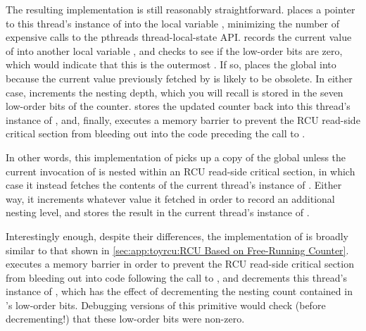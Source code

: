 \begin{lineref}
The resulting  implementation is still reasonably
straightforward.
 places a pointer to
this thread's instance of 
into the local variable , minimizing the number of expensive
calls to the pthreads thread-local-state API.
 records the current value of 
into another local variable , and  checks
to see if the low-order bits are zero, which would indicate that
this is the outermost .
If so,  places the global 
into  because the current value previously fetched by
 is likely to be obsolete.
In either case,  increments the nesting depth,
which you will recall is stored in the seven low-order bits of the counter.
 stores the updated counter back into this thread's
instance of , and,
finally,  executes a memory barrier
to prevent the RCU read-side critical section from bleeding out
into the code preceding the call to .
\end{lineref}

In other words, this implementation of  picks up a copy
of the global  unless the current invocation of
 is nested within an RCU read-side critical section,
in which case it instead fetches the contents of the current thread's
instance of .
Either way, it increments whatever value it fetched in order to record
an additional nesting level, and stores the result in the current
thread's instance of .

\begin{lineref}
Interestingly enough, despite their  differences,
the implementation of 
is broadly similar to that shown in
\cref{sec:app:toyrcu:RCU Based on Free-Running Counter}.
 executes a memory barrier
in order to prevent the RCU read-side
critical section from bleeding out into code following the call
to , and
 decrements this thread's instance of ,
which has the effect of decrementing the nesting count contained in
's low-order bits.
Debugging versions of this primitive would check (before decrementing!)
that these low-order bits were non-zero.
\end{lineref}


